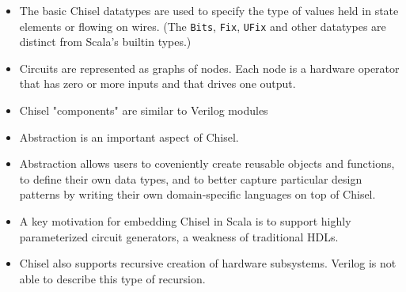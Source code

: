 \documentclass{beamer}
\begin{document}
\begin{frame}
\begin{itemize}

\item The basic Chisel datatypes are used to specify the type of values held in state elements or flowing on wires. (The \texttt{Bits}, \texttt{Fix}, \texttt{UFix} and other datatypes are distinct from Scala's builtin types.)

\item Circuits are represented as graphs of nodes. Each node is a hardware operator that has zero or more inputs and that drives one output.

\item Chisel "components" are similar to Verilog modules

\end{itemize}
\end{frame}

\begin{frame}
\begin{itemize}

\item Abstraction is an important aspect of Chisel.

\item Abstraction allows users to coveniently create reusable objects and functions, to define their own data types, and to better capture particular design patterns by writing their own domain-specific languages on top of Chisel.

\end{itemize}
\end{frame}

\begin{frame}
\begin{itemize}

\item A key motivation for embedding Chisel in Scala is to support highly parameterized circuit generators, a weakness of traditional HDLs.

\item Chisel also supports recursive creation of hardware subsystems. Verilog is not able to describe this type of recursion.

\end{itemize}
\end{frame}
\end{document}
